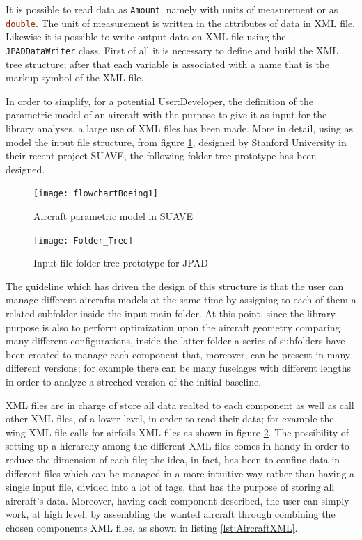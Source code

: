 \bigskip
\noindent
It is possible to read data as \lstinline[language=Java]!Amount!\cite{jscienceAmount}, namely with units of measurement or as \lstinline[language=Java]!double!. The unit of measurement is written in the attributes of data in XML file.
%
Likewise it is possible to write output data on XML file using the \lstinline[language=Java]!JPADDataWriter! class. First of all it is necessary to define and build the XML tree structure; after that each variable is associated with a name that is the markup symbol of the XML file.

\bigskip
\noindent
In order to simplify, for a potential \gls{User:Developer}, the definition of the parametric model of an aircraft with the purpose to give it as input for the library analyses, a large use of XML files has been made. More in detail, using as model the input file structure, from figure \ref{fig:SUAVE1}, designed by Stanford University in their recent project SUAVE\cite{SUAVE}, the following folder tree prototype has been designed.
%
\begin{figure}[!t]
\centering
\texttt{[image: flowchartBoeing1]}
\caption{Aircraft parametric model in SUAVE}
\label{fig:SUAVE1}
\end{figure}
%
\begin{figure}[!b]
\centering
\texttt{[image: Folder\_Tree]}
\caption{Input file folder tree prototype for JPAD}
\label{fig:inputJPAD}
\end{figure}

\bigskip
\noindent
The guideline which has driven the design of this structure is that the user can manage different aircrafts models at the same time by assigning to each of them a related subfolder inside the input main folder. At this point, since the library purpose is also to perform optimization upon the aircraft geometry comparing many different configurations, inside the latter folder a series of subfolders have been created to manage each component that, moreover, can be present in many different versions; for example there can be many fuselages with different lengths in order to analyze a streched version of the initial baseline. 

\bigskip
\noindent
XML files are in charge of store all data realted to each component as well as call other XML files, of a lower level, in order to read their data; for example the wing XML file calls for airfoils XML files as shown in figure \ref{fig:inputJPAD}. The possibility of setting up a hierarchy among the different XML files comes in handy in order to reduce the dimension of each file; the idea, in fact, has been to confine data in different files which can be managed in a more intuitive way rather than having a single input file, divided into a lot of tags, that has the purpose of storing all aircraft's data. Moreover, having each component described, the user can simply work, at high level, by assembling the wanted aircraft through combining the chosen components XML files, as shown in listing \ref{lst:AircraftXML}.

